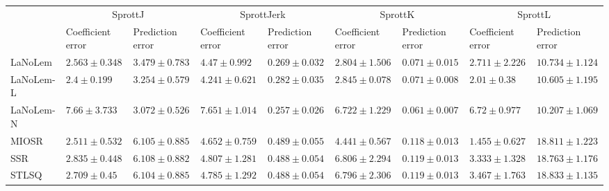 \begin{table*}
{\begin{tabular}{lllllllll}
 & \multicolumn{2}{c}{SprottJ} & \multicolumn{2}{c}{SprottJerk} & \multicolumn{2}{c}{SprottK} & \multicolumn{2}{c}{SprottL} \\
 & Coefficient error & Prediction error & Coefficient error & Prediction error & Coefficient error & Prediction error & Coefficient error & Prediction error \\
\midrule
LaNoLem & $2.563\pm 0.348$ & $3.479\pm 0.783$ & $4.47\pm 0.992$ & $0.269\pm 0.032$ & $\mathbf{2.804}\pm 1.506$ & $0.071\pm 0.015$ & $2.711\pm 2.226$ & $10.734\pm 1.124$ \\
LaNoLem-L & $\mathbf{2.4}\pm 0.199$ & $3.254\pm 0.579$ & $\mathbf{4.241}\pm 0.621$ & $0.282\pm 0.035$ & $2.845\pm 0.078$ & $0.071\pm 0.008$ & $2.01\pm 0.38$ & $10.605\pm 1.195$ \\
LaNoLem-N & $7.66\pm 3.733$ & $\mathbf{3.072}\pm 0.526$ & $7.651\pm 1.014$ & $\mathbf{0.257}\pm 0.026$ & $6.722\pm 1.229$ & $\mathbf{0.061}\pm 0.007$ & $6.72\pm 0.977$ & $\mathbf{10.207}\pm 1.069$ \\
MIOSR & $2.511\pm 0.532$ & $6.105\pm 0.885$ & $4.652\pm 0.759$ & $0.489\pm 0.055$ & $4.441\pm 0.567$ & $0.118\pm 0.013$ & $\mathbf{1.455}\pm 0.627$ & $18.811\pm 1.223$ \\
SSR & $2.835\pm 0.448$ & $6.108\pm 0.882$ & $4.807\pm 1.281$ & $0.488\pm 0.054$ & $6.806\pm 2.294$ & $0.119\pm 0.013$ & $3.333\pm 1.328$ & $18.763\pm 1.176$ \\
STLSQ & $2.709\pm 0.45$ & $6.104\pm 0.885$ & $4.785\pm 1.292$ & $0.488\pm 0.054$ & $6.796\pm 2.306$ & $0.119\pm 0.013$ & $3.467\pm 1.763$ & $18.833\pm 1.135$ \\

\midrule


\end{tabular}}
\end{table*}
